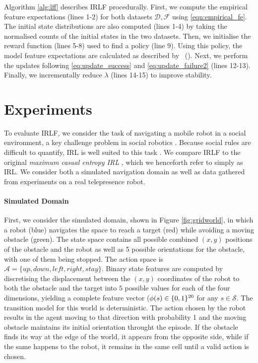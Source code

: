 \documentclass[letterpaper]{article}
\newcommand{\citet}[1]{\citeauthor{#1}~(\citeyear{#1})}
\begin{document}
Algorithm \ref{alg:lff} describes IRLF procedurally. First, we compute the empirical feature expectations (lines 1-2) for both datasets $\mathcal{D},\mathcal{F}$ using \eqref{eqn:empirical_fe}.	The initial state distributions are also computed (lines 1-4) by taking the normalised counts of the initial states in the two datasets. Then, we initialise the reward function (lines 5-8) used to find a policy (line 9). Using this policy, the model feature expectations are calculated as described by \citet{ziebart2013principle}. Next, we perform the updates following \eqref{eq:update_success} and \eqref{eq:update_failure2} (lines 12-13). Finally, we incrementally reduce $\lambda$ (lines 14-15) to improve stability.

\section{Experiments}

To evaluate IRLF, we consider the task of navigating a mobile robot in a social environment, a key challenge problem in social robotics \cite{pacchierotti2006embodied}. Because social rules are difficult to quantify, IRL is well suited to this task \cite{henry2010learning,vasquez2014inverse}.  We compare IRLF to the original \emph{maximum casual entropy IRL} \cite{ziebart2008maximum}, which we henceforth refer to simply as IRL.  We  consider both a simulated navigation domain as well as data gathered from experiments on a real telepresence robot.
\vspace{-4mm}
\paragraph{Simulated Domain}

First, we consider the simulated domain, shown in Figure \ref{fig:gridworld}, in which a robot (blue) navigates the space to reach a target (red) while avoiding a moving
obstacle (green). The state space contains all possible combined $(x,y)$ positions of the obstacle and the robot as well as 5 possible orientations for the obstacle, with one of them being stopped. The action space is $\mathcal{A} = \{up,down,left,right,stay\}$. Binary state features are computed by discretising the displacement between the $(x,y)$ coordinates of the robot to both the obstacle and the target into $5$ possible values for each of the four dimensions, yielding a complete feature vector ($\phi(s)\in\mathbb \{0,1\}^{20}$ for any $s\in\mathcal{S}$. The transition model for this world is deterministic. The action chosen by the robot results in the agent moving to that direction with probability 1 and the moving obstacle maintains its initial orientation throught the episode. If the obstacle finds its way at the edge of the world, it appears from the opposite side, while if the same happens to the robot, it remains in the same cell until a valid action is chosen.
\end{document}
